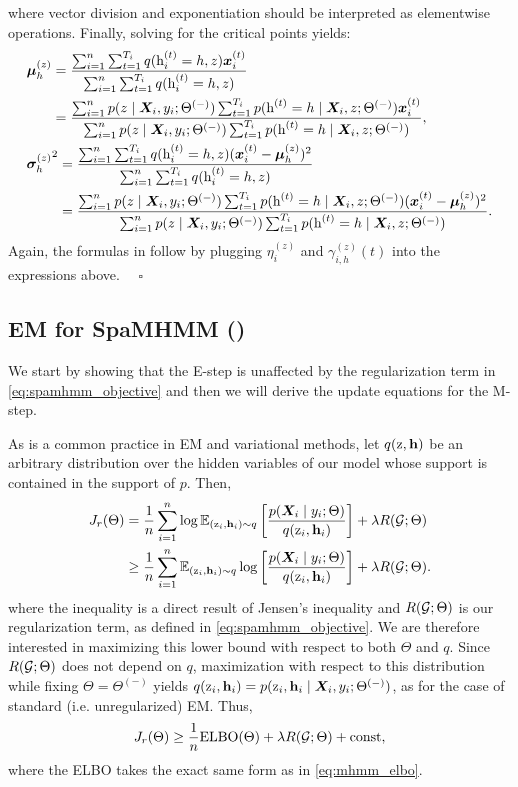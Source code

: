 where vector division and exponentiation should be interpreted as elementwise operations. Finally, solving for the critical points yields:
\begin{align}
&\vmu^{(z)}_h = \frac{\sum_{i=1}^n  \sum_{t=1}^{T_i} q(\rh^{(t)}_i=h, z) \vx^{(t)}_i}{\sum_{i=1}^n  \sum_{t=1}^{T_i} q(\rh^{(t)}_i=h, z)} \nonumber\\
&\hphantom{\vmu^{(z)}_h} = \frac{\sum_{i=1}^n p(z \mid \mX_i, y_i; \Theta^{(-)}) \sum_{t=1}^{T_i} p(\rh^{(t)}=h \mid \mX_i, z; \Theta^{(-)}) \vx^{(t)}_i}{\sum_{i=1}^n p(z \mid \mX_i, y_i; \Theta^{(-)}) \sum_{t=1}^{T_i} p(\rh^{(t)}=h \mid \mX_i, z; \Theta^{(-)})}, \\
&{\vsigma^{(z)}_h}^2 = \frac{\sum_{i=1}^n  \sum_{t=1}^{T_i} q(\rh^{(t)}_i=h, z) (\vx^{(t)}_i - \vmu^{(z)}_h)^2}{\sum_{i=1}^n  \sum_{t=1}^{T_i} q(\rh^{(t)}_i=h, z)} \nonumber\\
&\hphantom{{\vsigma^{(z)}_h}^2} = \frac{\sum_{i=1}^n p(z \mid \mX_i, y_i; \Theta^{(-)}) \sum_{t=1}^{T_i} p(\rh^{(t)}=h \mid \mX_i, z; \Theta^{(-)}) (\vx^{(t)}_i - \vmu^{(z)}_h)^2}{\sum_{i=1}^n p(z \mid \mX_i, y_i; \Theta^{(-)}) \sum_{t=1}^{T_i} p(\rh^{(t)}=h \mid \mX_i, z; \Theta^{(-)})}.
\end{align}
Again, the formulas in  follow by plugging $\eta^{(z)}_i$ and $\gamma^{(z)}_{i,h}(t)$ into the expressions above. $\quad \square$

\subsection{EM for SpaMHMM ()}
\label{sec:proof_em_reg}
We start by showing that the E-step is unaffected by the regularization term in \eqref{eq:spamhmm_objective} and then we will derive the update equations for the M-step.

As is a common practice in EM and variational methods, let $q({\textnormal{z}}, {\mathbf{h}})$ be an arbitrary distribution over the hidden variables of our model whose support is contained in the support of $p$. Then,
\begin{align}
	J_r(\Theta) &= \frac{1}{n}\sum_{i=1}^n \log \mathbb{E}_{({\textnormal{z}}_i, {\mathbf{h}}_i) \sim q} \left[ \frac{p({\bm{X}}_i \mid y_i; \Theta)}{q({\textnormal{z}}_i, {\mathbf{h}}_i)} \right] + \lambda R({\mathcal{G}}; \Theta) \nonumber\\
	&\geq  \frac{1}{n}\sum_{i=1}^n \mathbb{E}_{({\textnormal{z}}_i, {\mathbf{h}}_i) \sim q} \log \left[ \frac{p({\bm{X}}_i \mid y_i; \Theta)}{q({\textnormal{z}}_i, {\mathbf{h}}_i)} \right] + \lambda R({\mathcal{G}}; \Theta).
\end{align}
where the inequality is a direct result of Jensen's inequality and $R({\mathcal{G}}; \Theta)$ is our regularization term, as defined in \eqref{eq:spamhmm_objective}. We are therefore interested in maximizing this lower bound with respect to both $\Theta$ and $q$. Since $R({\mathcal{G}}; \Theta)$ does not depend on $q$, maximization with respect to this distribution while fixing $\Theta = \Theta^{(-)}$ yields $q({\textnormal{z}}_i, {\mathbf{h}}_i) = p({\textnormal{z}}_i, {\mathbf{h}}_i \mid {\bm{X}}_i, y_i; \Theta^{(-)})$, as for the case of standard (i.e. unregularized) EM. Thus,
\begin{equation}
	J_r(\Theta) \geq \frac{1}{n} \mathrm{ELBO}(\Theta) + \lambda R({\mathcal{G}}; \Theta) + \text{const},
\end{equation}
where the ELBO takes the exact same form as in \eqref{eq:mhmm_elbo}.

